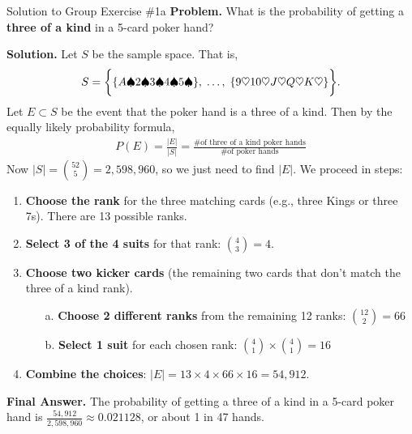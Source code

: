 \documentclass[10pt]{beamer}
\begin{document}
\begin{frame}{Solution to Group Exercise \#1a}
\footnotesize 
 \colorbox{blue!30}{\textbf{Problem.}} What is the probability of getting a \textbf{three of a kind} in a 5-card poker hand? 
 \vfill 

 \colorbox{green!30}{\textbf{Solution.}} Let $S$ be the sample space.  That is, 
\[S=\bigg\{ \{ {A\spadesuit 2 \spadesuit 3 \spadesuit 4 \spadesuit 5 \spadesuit} \}, \;   \hdots, \; \{ {9 \heartsuit 10 \heartsuit J \heartsuit Q \heartsuit K \heartsuit} \} \bigg\}. \]
Let $E \subset S$ be the event that the poker hand is a three of a kind. Then by the equally likely probability formula, 
\begin{align*}
P(E) = 	\frac{|E|}{|S|} = \frac{\text{\# of three of a kind poker hands}}{\text{\# of poker hands}}
\end{align*}
Now $|S|=\binom{52}{5} =  2,598,960$, so we just need to find $|E|$.  We proceed in steps:

\begin{enumerate} \footnotesize 
\item \textbf{Choose the rank} for the three matching cards 	(e.g., three Kings or three 7s).  There are 13 possible ranks.
\item \textbf{Select 3 of the 4 suits} for that rank:  $\binom{4}{3}=4$.
\item  \textbf{Choose two kicker cards} (the remaining two cards that don't match the three of a kind rank). 
	\begin{itemize} \footnotesize 
	\item[a.] 	\textbf{Choose 2 different ranks} from the remaining 12 ranks: $\binom{12}{2} = 66$ 
	\item[b.] \textbf{Select 1 suit} for each chosen rank: $\binom{4}{1} \times \binom{4}{1} = 16$
	\end{itemize}
\item \textbf{Combine the choices}:  $|E|=13 \times 4 \times 66 \times 16 = 54,912$.
\end{enumerate}
\vspace{-.1cm}
\alert{\textbf{Final Answer.}} The probability of getting a three of a kind in a 5-card poker hand is $\frac{54,912}{2,598,960} \approx 0.021128$, or about 1 in 47 hands.
\end{frame}
\end{document}
